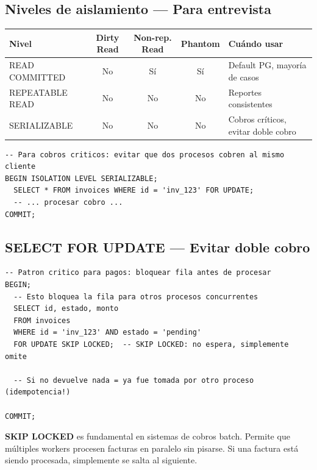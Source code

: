 \documentclass[11pt,a4paper]{article}
\begin{document}
\subsection{Niveles de aislamiento — Para entrevista}

\begin{center}
\begin{tabular}{lcccp{3.5cm}}
\toprule
\textbf{Nivel} & \textbf{Dirty Read} & \textbf{Non-rep. Read} & \textbf{Phantom} & \textbf{Cuándo usar} \\
\midrule
READ COMMITTED & No & Sí & Sí & Default PG, mayoría de casos \\
REPEATABLE READ & No & No & No & Reportes consistentes \\
SERIALIZABLE & No & No & No & Cobros críticos, evitar doble cobro \\
\bottomrule
\end{tabular}
\end{center}

\begin{lstlisting}[style=sql]
-- Para cobros criticos: evitar que dos procesos cobren al mismo cliente
BEGIN ISOLATION LEVEL SERIALIZABLE;
  SELECT * FROM invoices WHERE id = 'inv_123' FOR UPDATE;
  -- ... procesar cobro ...
COMMIT;
\end{lstlisting}

\subsection{SELECT FOR UPDATE — Evitar doble cobro}

\begin{lstlisting}[style=sql]
-- Patron critico para pagos: bloquear fila antes de procesar
BEGIN;
  -- Esto bloquea la fila para otros procesos concurrentes
  SELECT id, estado, monto
  FROM invoices
  WHERE id = 'inv_123' AND estado = 'pending'
  FOR UPDATE SKIP LOCKED;  -- SKIP LOCKED: no espera, simplemente omite

  -- Si no devuelve nada = ya fue tomada por otro proceso (idempotencia!)

COMMIT;
\end{lstlisting}

\begin{alertbox}
\textbf{SKIP LOCKED} es fundamental en sistemas de cobros batch.
Permite que múltiples workers procesen facturas en paralelo sin pisarse.
Si una factura está siendo procesada, simplemente se salta al siguiente.
\end{alertbox}
\end{document}

